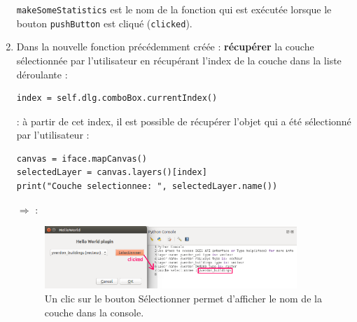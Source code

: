 \documentclass[11pt]{article}
\begin{document}
\begin{enumerate}
\og{}\texttt{makeSomeStatistics}\fg{} est le nom de la fonction qui est exécutée lorsque le bouton \og{}\texttt{pushButton}\fg{} est cliqué (\og{}\texttt{clicked}\fg{}). 

\item Dans la nouvelle fonction précédemment créée : \textbf{récupérer} la couche sélectionnée par l'utilisateur en récupérant l'index de la couche dans la liste déroulante : 
\vspace*{-1em}
\begin{center}
\begin{minipage}[t]{0.48\textwidth}
\begin{verbatim}
index = self.dlg.comboBox.currentIndex()
\end{verbatim}
\end{minipage}
\end{center}
\vspace*{.8em}

\underline{}: à partir de cet index, il est possible de récupérer l'objet qui a été sélectionné par l'utilisateur : 
\vspace*{-1.64em}
\begin{center}
\begin{minipage}[t]{0.60\textwidth}
\begin{verbatim}
canvas = iface.mapCanvas()
selectedLayer = canvas.layers()[index]
print("Couche selectionnee: ", selectedLayer.name())
\end{verbatim}
\end{minipage}
\end{center}
\vspace*{1em}


$\Rightarrow$ \underline{}:
\begin{figure}[H]
    \centering
    \includegraphics[width=0.9\textwidth]{clicked.png}
    \vspace*{-0.4em}
    \caption[Affichage en console du nom de la couche par simple clic sur le bouton \og{}Sélectionner\fg{}]{Un clic sur le bouton \og{}Sélectionner\fg{} permet d'afficher le nom de la couche dans la console.}
    \label{res2}
\end{figure}
\vspace*{-1em}


\end{enumerate}
\end{document}
